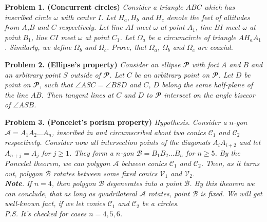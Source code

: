 \documentclass[12pt]{extarticle}
\renewcommand{\P}{\mathbfcal{P}}
\newcommand{\C}{\mathcal{C}}
\newcommand{\V}{\mathcal{V}}
\begin{document}
\textbf{Problem 1. (Concurrent circles)}
\textit{
Consider a triangle \(ABC\) which has inscribed circle \(\omega\) with 
center \(I\). 
Let \(H_a, H_b\) and \(H_c\) denote the feet
of altitudes from \(A\),\(B\) and \(C\) respectively. Let 
line \(AI\) meet \(\omega\) at point \(A_1\),
line \(BI\) meet \(\omega\) at point \(B_1\),
line \(CI\) meet \(\omega\) at point \(C_1\).
Let \(\Omega_a\) be a circumcircle of triangle \(AH_aA_1\). 
Similarly, we define \(\Omega_b\) and \(\Omega_c\).
Prove, that \(\Omega_a\), \(\Omega_b\) and \(\Omega_c\) are coaxial.\\
}

\textbf{Problem 2. (Ellipse's property)}
\textit{
Consider an ellipse \(\P\) with foci \(A\) and \(B\) and an arbitrary 
point \(S\) outside of \(\P\). Let \(C\) be an arbitrary point on 
\(\P\). Let \(D\) be point on \(\P\), such that \(\angle ASC = \angle BSD\) and \(C\), \(D\) belong the same half-plane of the line \(AB\). 
Then tangent lines at \(C\) and \(D\) to \(\P\) intersect on the 
angle bisecor of \(\angle ASB\).\\
}
 


\textbf{Problem 3. (Poncelet's porism property)}
\textit{
Hypothesis. Consider a \(n\)-gon \(\mathcal{A}=A_1A_2…A_n\), inscribed in and 
circumscribed about two conics \(\C_1\) and \(\C_2\) respectively.
Consider now all intersection points of the diagonals 
\(A_iA_{i+2}\) and let \(A_{n+j} = A_j\) for \(j \geqslant 1\). 
They form a \(n\)-gon \(\mathcal{B}=B_1B_2…B_n\) for \(n \geqslant 5\).
By the Poncelet theorem, we can  polygon 
\(\mathcal{A}\) between conics \(\C_1\) and \(\C_2\). 
Then, as it turns out, polygon \(\mathcal{B}\) rotates between some 
fixed conics \(\V_1\) and \(\V_2\).\\
\indent \textbf{Note}. If \(n = 4\), then polygon \(\mathcal{B}\) 
degenerates into a point \(\mathscr{B}\). By this theorem we can conclude, 
that as long as quadrilateral \(\mathcal{A}\) rotates, 
point \(\mathscr{B}\) is fixed. We will get well-known fact, if we let 
conics \(\C_1\) and \(\C_2\) be a circles.\\
\indent P.S. It's checked for cases \(n = 4,5,6\).\\
}
\end{document}
